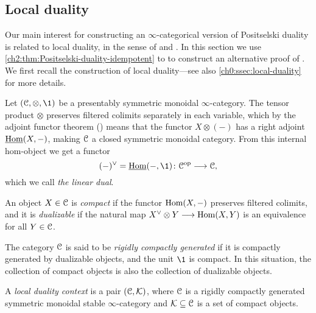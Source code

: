 

\subsection{Local duality}
\label{ch2:ssec:local-duality}

Our main interest for constructing an $\infty$-categorical version of Positselski duality is related to local duality, in the sense of \cite{hovey-palmiery-strickland_97} and \cite{barthel-heard-valenzuela_2018}. In this section we use \cref{ch2:thm:Positselski-duality-idempotent} to to construct an alternative proof of \cite[2.21]{barthel-heard-valenzuela_2018}. We first recall the construction of local duality---see also \cref{ch0:ssec:local-duality} for more details. 

Let $(\C, \otimes, \1)$ be a presentably symmetric monoidal $\infty$-category. The tensor product $\otimes$ preserves filtered colimits separately in each variable, which by the adjoint functor theorem (\cite[5.5.2.9]{lurie_09}) means that the functor $X\otimes (-)$ has a right adjoint $\operatorname{\underline{Hom}}(X, -)$, making $\EuScript{C}$ a closed symmetric monoidal category. From this internal hom-object we get a functor 
\[(-)^\vee = \iHom(-, \1)\: \C\op \to \C,\] 
which we call \emph{the linear dual}. 

\begin{definition}
    An object $X\in \EuScript{C}$ is \emph{compact} if the functor $\operatorname{Hom}(X, -)$ preserves filtered colimits, and it is \emph{dualizable} if the natural map $X^\vee \otimes Y \longrightarrow \operatorname{Hom}(X,Y)$ is an equivalence for all $Y\in \EuScript{C}$. 
\end{definition}

The category $\EuScript{C}$ is said to be \emph{rigidly compactly generated} if it is compactly generated by dualizable objects, and the unit $\1$ is compact. In this situation, the collection of compact objects is also the collection of dualizable objects. 

\begin{definition}
    A \emph{local duality context} is a pair $(\EuScript{C}, \mathcal{K})$, where $\EuScript{C}$ is a rigidly compactly generated symmetric monoidal stable $\infty$-category and $\mathcal{K}\subseteq \EuScript{C}$ is a set of compact objects. 
\end{definition}

